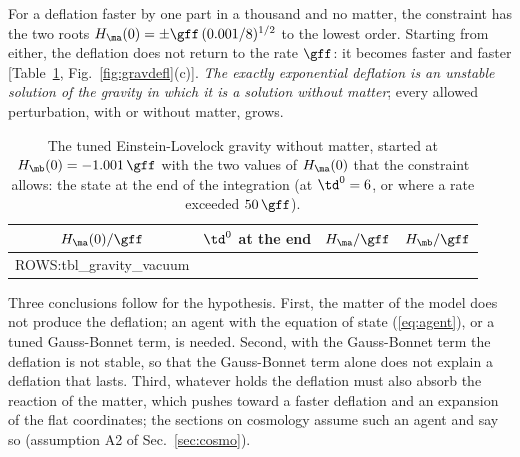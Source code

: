For a deflation faster by one part in a thousand and no matter, the constraint has the two roots
$H_{\ma}(0)=\pm\gff\,(0.001/8)^{1/2}$ to the lowest order. Starting from either, the deflation does
not return to the rate $\gff$: it becomes faster and faster
[Table~\ref{tab:gravvac}, Fig.~\ref{fig:gravdefl}(c)]. \emph{The exactly exponential deflation is an
unstable solution of the gravity in which it is a solution without matter}; every allowed
perturbation, with or without matter, grows.

\begin{table}
\caption{\label{tab:gravvac}The tuned Einstein-Lovelock gravity without matter, started at
$H_{\mb}(0)=-1.001\,\gff$ with the two values of $H_{\ma}(0)$ that the constraint allows: the state
at the end of the integration (at $\td^{0}=6$, or where a rate exceeded $50\,\gff$).}
\begin{ruledtabular}
\begin{tabular}{cccc}
$H_{\ma}(0)/\gff$ & $\td^{0}$ at the end & $H_{\ma}/\gff$ & $H_{\mb}/\gff$ \\
\hline
{{ROWS:tbl_gravity_vacuum}}
\end{tabular}
\end{ruledtabular}
\end{table}

Three conclusions follow for the hypothesis. First, the matter of the model does not produce the
deflation; an agent with the equation of state (\ref{eq:agent}), or a tuned Gauss-Bonnet term, is
needed. Second, with the Gauss-Bonnet term the deflation is not stable, so that the Gauss-Bonnet term
alone does not explain a deflation that lasts. Third, whatever holds the deflation must also absorb
the reaction of the matter, which pushes toward a faster deflation and an expansion of the flat
coordinates; the sections on cosmology assume such an agent and say so (assumption A2 of
Sec.~\ref{sec:cosmo}).

